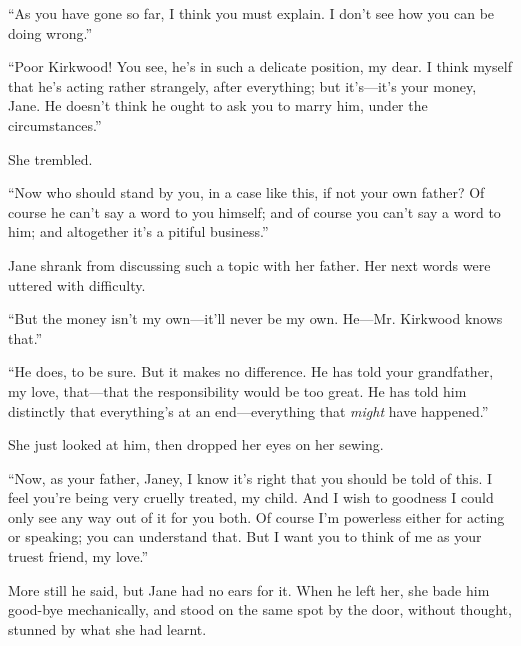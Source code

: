 ``As you have gone so far, I think you must explain. I don't see how you
can be doing wrong.''

{\protect\hypertarget{126}{}{}}``Poor Kirkwood! You see, he's in such a
delicate position, my dear. I think myself that he's acting rather
strangely, after everything; but it's---it's your money, Jane. He
doesn't think he ought to ask you to marry him, under the
circumstances.''

She trembled.

``Now who should stand by you, in a case like this, if not your own
father? Of course he can't say a word to you himself; and of course you
can't say a word to him; and altogether it's a pitiful business.''

Jane shrank from discussing such a topic with her father. Her next words
were uttered with difficulty.

``But the money isn't my own---it'll never be my own. He---Mr. Kirkwood
knows that.''

``He does, to be sure. But it makes no difference. He has told your
grandfather, my love, that---that the responsibility would be too great.
He has told him distinctly that everything's at an end---everything that
\emph{might} have happened.''

She just looked at him, then dropped her eyes on her sewing.

``Now, as your father, Janey, I know it's
{\protect\hypertarget{127}{}{}}right that you should be told of this. I
feel you're being very cruelly treated, my child. And I wish to goodness
I could only see any way out of it for you both. Of course I'm powerless
either for acting or speaking; you can understand that. But I want you
to think of me as your truest friend, my love.''

More still he said, but Jane had no ears for it. When he left her, she
bade him good-bye mechanically, and stood on the same spot by the door,
without thought, stunned by what she had learnt.

